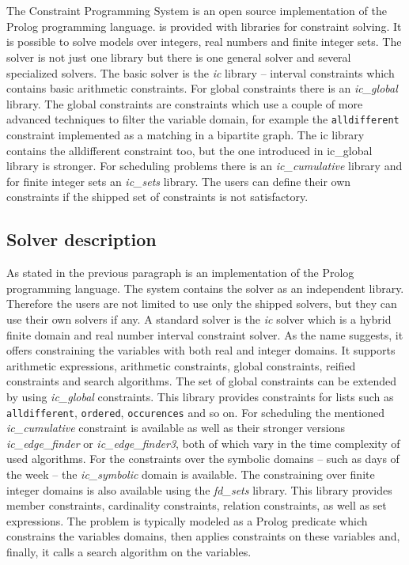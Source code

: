 \section{\eclipse}

The \eclipse Constraint Programming System is an open source implementation of 
the Prolog programming language. \eclipse is provided with libraries for constraint 
solving. It is possible to solve models over integers, real numbers and finite 
integer sets. The solver is not just one library but there is one general solver 
and several specialized solvers. The basic solver is the {\em ic} library -- interval 
constraints which contains basic arithmetic constraints. For global constraints there 
is an {\em ic\_global} library. The global constraints are constraints
which use a couple of more advanced techniques to filter the variable domain, for example 
the \texttt{alldifferent} constraint implemented as a matching in a bipartite graph.
The ic library contains the alldifferent constraint too, but the one introduced in
ic\_global library is stronger. For scheduling problems there is an {\em ic\_cumulative}
library and for finite integer sets an {\em ic\_sets} library. The users can define their own
constraints if the shipped set of constraints is not satisfactory.

\subsection{Solver description}
As stated in the previous paragraph \eclipse is an implementation of the Prolog programming language.
The system contains the solver as an independent library. Therefore the users are not 
limited to use only the shipped solvers, but they can use their own solvers if any.
A standard solver is the {\em ic} solver which is a hybrid finite domain and real number 
interval constraint solver. As the name suggests, it offers constraining the variables with
both real and integer domains. It supports arithmetic expressions, arithmetic constraints,
global constraints, reified constraints and search algorithms. The set of global constraints
can be extended by using {\em ic\_global} constraints. This library provides constraints
for lists such as \texttt{alldifferent}, \texttt{ordered}, \texttt{occurences} and so on.
For scheduling the mentioned {\em ic\_cumulative} constraint is available as well as 
their stronger versions {\em ic\_edge\_finder} or {\em ic\_ed\-ge\_fin\-der3}, both of which
vary in the time complexity of used algorithms. For the constraints over the symbolic 
domains -- such as days of the week -- the {\em ic\_symbolic} domain is available.  The 
constraining over finite integer domains is also available using the {\em fd\_sets} library.
This library provides member constraints, cardinality constraints, relation constraints,
as well as set expressions. The problem is typically modeled as a Prolog predicate 
which constrains the variables domains, then applies constraints on these variables 
and, finally, it calls a search algorithm on the variables. 

